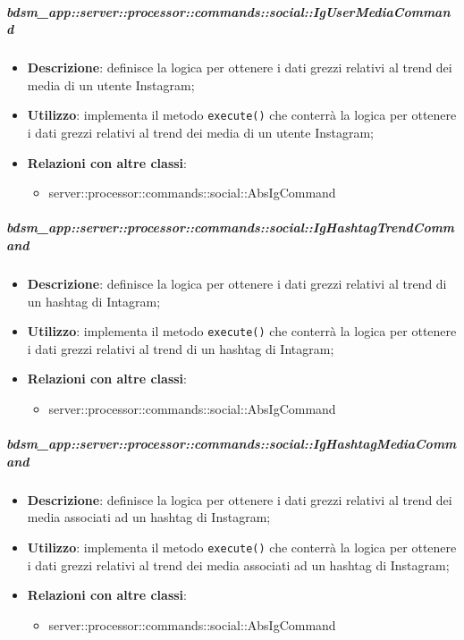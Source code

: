         \subparagraph{bdsm\_app::server::processor::commands::social::IgUserMediaCommand} %
        \label{subp:bdsm_app_server_processor_commands_social_igusermediacommand}
        \begin{itemize}
          \item \textbf{Descrizione}: definisce la logica per ottenere i dati grezzi relativi al trend dei media di un utente Instagram;
          \item \textbf{Utilizzo}: implementa il metodo \texttt{execute()} che conterrà la logica per ottenere i dati grezzi relativi al trend dei media di un utente Instagram;
          \item \textbf{Relazioni con altre classi}:
            \begin{itemize}
              \item server::processor::commands::social::AbsIgCommand
            \end{itemize}
        \end{itemize}

        \subparagraph{bdsm\_app::server::processor::commands::social::IgHashtagTrendCommand} %
        \label{subp:bdsm_app_server_processor_commands_social_ighashtagtrendcommand}
        \begin{itemize}
          \item \textbf{Descrizione}: definisce la logica per ottenere i dati grezzi relativi al trend di un hashtag di Intagram;
          \item \textbf{Utilizzo}: implementa il metodo \texttt{execute()} che conterrà la logica per ottenere i dati grezzi relativi al trend di un hashtag di Intagram;
          \item \textbf{Relazioni con altre classi}:
            \begin{itemize}
              \item server::processor::commands::social::AbsIgCommand
            \end{itemize}
        \end{itemize}

        \subparagraph{bdsm\_app::server::processor::commands::social::IgHashtagMediaCommand} %
        \label{subp:bdsm_app_server_processor_commands_social_twhashtagmediacommand}
        \begin{itemize}
          \item \textbf{Descrizione}: definisce la logica per ottenere i dati grezzi relativi al trend dei media associati ad un hashtag di Instagram;
          \item \textbf{Utilizzo}: implementa il metodo \texttt{execute()} che conterrà la logica per ottenere i dati grezzi relativi al trend dei media associati ad un hashtag di Instagram;
          \item \textbf{Relazioni con altre classi}:
            \begin{itemize}
              \item server::processor::commands::social::AbsIgCommand
            \end{itemize}
        \end{itemize}


